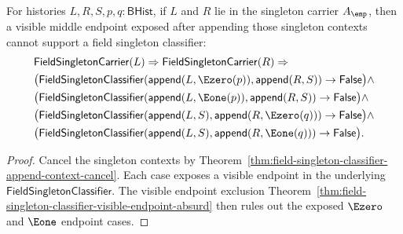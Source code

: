 \begin{theorem}
\label{thm:field-singleton-classifier-append-context-visible-middle-absurd}
For histories $L,R,S,p,q:\mathsf{BHist}$, if $L$ and $R$ lie in the
singleton carrier $A_{\emp}$, then a visible middle endpoint exposed after
appending those singleton contexts cannot support a field singleton
classifier:
$$
\begin{aligned}
&\mathsf{FieldSingletonCarrier}(L)\Rightarrow
\mathsf{FieldSingletonCarrier}(R)\Rightarrow\\
&\bigl(
\mathsf{FieldSingletonClassifier}(\mathsf{append}(L,\Ezero(p)),\mathsf{append}(R,S))
\to\mathsf{False}\bigr)\land\\
&\bigl(
\mathsf{FieldSingletonClassifier}(\mathsf{append}(L,\Eone(p)),\mathsf{append}(R,S))
\to\mathsf{False}\bigr)\land\\
&\bigl(
\mathsf{FieldSingletonClassifier}(\mathsf{append}(L,S),\mathsf{append}(R,\Ezero(q)))
\to\mathsf{False}\bigr)\land\\
&\bigl(
\mathsf{FieldSingletonClassifier}(\mathsf{append}(L,S),\mathsf{append}(R,\Eone(q)))
\to\mathsf{False}\bigr).
\end{aligned}
$$
\end{theorem}
\begin{proof}
Cancel the singleton contexts by
Theorem~\ref{thm:field-singleton-classifier-append-context-cancel}. Each
case exposes a visible endpoint in the underlying
$\mathsf{FieldSingletonClassifier}$. The visible endpoint exclusion
Theorem~\ref{thm:field-singleton-classifier-visible-endpoint-absurd} then
rules out the exposed $\Ezero$ and $\Eone$ endpoint cases.
\end{proof}

